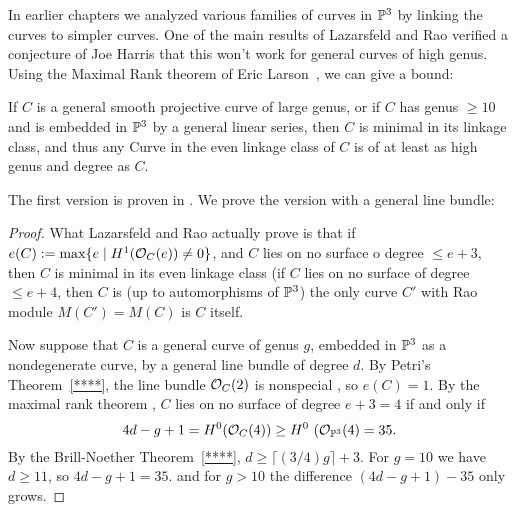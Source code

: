 In earlier chapters we analyzed various families of curves in ${\mathbb P}^3$ by linking the curves to simpler curves. One of the main
results of Lazarsfeld and Rao verified a conjecture of Joe Harris that this won't work for general curves of high genus.
Using the Maximal Rank theorem of Eric Larson~\cite{Larson}, we can give a bound:

\begin{theorem}
If $C$ is a general smooth projective curve of large genus, or if $C$ has genus $\geq 10$ and is embedded in ${\mathbb P}^3$ by a general linear series,
then $C$ is minimal in its linkage class, and thus any Curve in the even linkage class of $C$ is of at least as high genus and degree as $C$.
\end{theorem}


The first version is proven in \cite{MR714753}. We prove the version with a general line bundle:
\begin{proof}
What Lazarsfeld and Rao actually prove is that if $e(C) := \max\{e \mid H^1({\mathcal O}_C(e)) \neq 0\}$, and $C$ lies on no surface o degree $\leq e+3$, then $C$ is minimal in its even linkage class (if $C$ lies on no surface of degree $\leq e+4$, then $C$ is (up to automorphisms of 
${\mathbb P}^3$) the only curve $C'$ with Rao module $M(C') = M(C)$ is $C$ itself.

Now suppose that $C$ is a general curve of genus $g$, embedded in ${\mathbb P}^3$ as a nondegenerate curve,
by a general line bundle of degree $d$.
 By Petri's Theorem~\ref{****},
the line bundle ${\mathcal O}_C(2)$ is nonspecial , so $e(C) =1$. By the maximal rank theorem \cite{Larson},
$C$ lies on no surface of degree $e+3 = 4$ if and only if 
$$
4d-g+1 = H^0(\sO_C(4)) \geq H^0 (\sO_{\PP^3}(4) = 35.
$$ 
By the Brill-Noether Theorem~\ref{****},  $d\geq\lceil (3/4)g\rceil+3$.
For $g = 10$ we have $d\geq 11$, so $4d-g+1 = 35$.
and for $g>10$ the difference $(4d-g+1)-35$ only grows.
\end{proof}

